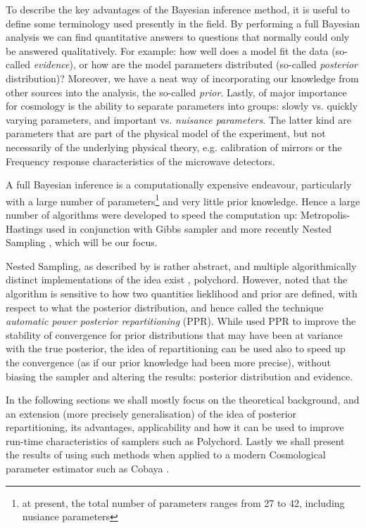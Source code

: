 \documentclass[usenatbib]{mnras}
\begin{document}
To describe the key advantages of the Bayesian inference method, it
is useful to define some terminology used presently in the field.
By performing a full Bayesian analysis we can find quantitative
answers to questions that normally could only be answered
qualitatively. For example: how well does a model fit the data
(so-called \emph{evidence}), or how are the model parameters distributed
(so-called \emph{posterior} distribution)? Moreover, we have a neat way
of incorporating our knowledge from other sources into the analysis,
the so-called \emph{prior}. Lastly, of major importance for cosmology is
the ability to separate parameters into groups: slowly vs. quickly
varying parameters, and important vs. \emph{nuisance parameters}. The
latter kind are parameters that are part of the physical model of
the experiment, but not necessarily of the underlying physical
theory, e.g. calibration of mirrors or the Frequency response
characteristics of the microwave detectors. 

A full Bayesian inference is a computationally expensive endeavour,
particularly with a large number of parameters\footnote{at present, the total number of parameters ranges from 27 to 42, including nusiance parameters} 
and very little prior knowledge. Hence a large number of algorithms were developed to speed the computation up: Metropolis-Hastings \citep{Metropolis} used in conjunction with Gibbs sampler \citep{Metropolis-hastings-gibbs} and more recently Nested Sampling \citep{skilling2006}, which will be our focus. 

Nested Sampling, as described by \citeauthor{skilling2006} is rather abstract, and multiple algorithmically distinct implementations of the idea exist \citep{Feroz2009MultiNestAE}, polychord. However, \cite{chen-ferroz-hobson} noted that the algorithm is sensitive to how two quantities lieklihood and prior are defined, with respect to what the posterior distribution, and hence called the technique \emph{automatic power posterior repartitioning} (PPR). While \citeauthor{chen-ferroz-hobson} used PPR to improve the stability of convergence for prior distributions that may have been at variance with the true posterior, the idea of repartitioning can be used also to speed up the convergence (as if our prior knowledge had been more precise), without biasing the sampler and altering the results: posterior distribution and evidence. 

In the following sections we shall mostly focus on the theoretical background, and an extension (more precisely generalisation) of the idea of posterior repartitioning, its advantages, applicability and how it can be used to improve run-time characteristics of samplers such as Polychord. Lastly we shall present the results of using such methods when applied to a modern Cosmological parameter estimator such as Cobaya \citep{cobaya}.
\end{document}
